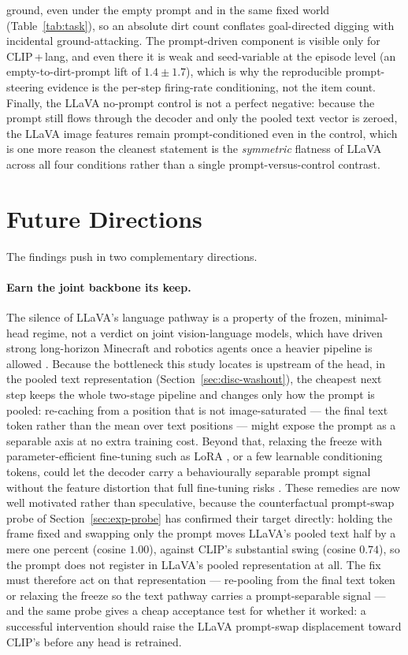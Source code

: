 ground, even under the empty prompt and in the same fixed world
(Table~\ref{tab:task}), so an absolute dirt count conflates goal-directed digging
with incidental ground-attacking. The prompt-driven component is visible only for
CLIP\,+\,lang, and even there it is weak and seed-variable at the episode level
(an empty-to-dirt-prompt lift of $1.4\pm1.7$), which is why the reproducible
prompt-steering evidence is the per-step firing-rate conditioning, not the item
count. Finally, the LLaVA no-prompt control is not a perfect
negative: because the prompt still flows through the decoder and only the pooled
text vector is zeroed, the LLaVA image features remain prompt-conditioned even in
the control, which is one more reason the cleanest statement is the
\emph{symmetric} flatness of LLaVA across all four conditions rather than a single
prompt-versus-control contrast.

\section{Future Directions}
\label{sec:disc-future}

The findings push in two complementary directions.

\paragraph{Earn the joint backbone its keep.} The silence of LLaVA's language
pathway is a property of the frozen, minimal-head regime, not a verdict on joint
vision-language models, which have driven strong long-horizon Minecraft and
robotics agents once a heavier pipeline is allowed
\cite{li2025jarvisvla, kim2024openvla, brohan2023rt2, black2024pi0}. Because the
bottleneck this study locates is upstream of the head, in the pooled text
representation (Section~\ref{sec:disc-washout}), the cheapest next step keeps the
whole two-stage pipeline and changes only how the prompt is pooled: re-caching from
a position that is not image-saturated --- the final text token rather than the
mean over text positions --- might expose the prompt as a separable axis at no
extra training cost. Beyond that, relaxing the freeze with parameter-efficient
fine-tuning such as LoRA \cite{hu2022lora}, or a few learnable conditioning tokens,
could let the decoder carry a behaviourally separable prompt signal without the
feature distortion that full fine-tuning risks
\cite{kumar2022finetuningdistortpretrainedfeatures, simchowitz2025pitfalls}.
These remedies are now well motivated rather than speculative, because the
counterfactual prompt-swap probe of Section~\ref{sec:exp-probe} has confirmed
their target directly: holding the frame fixed and swapping only the prompt moves
LLaVA's pooled text half by a mere one percent (cosine $1.00$), against CLIP's
substantial swing (cosine $0.74$), so the prompt does not register in LLaVA's
pooled representation at all. The fix must therefore act on that representation ---
re-pooling from the final text token or relaxing the freeze so the text pathway
carries a prompt-separable signal --- and the same probe gives a cheap acceptance
test for whether it worked: a successful intervention should raise the LLaVA
prompt-swap displacement toward CLIP's before any head is retrained.

